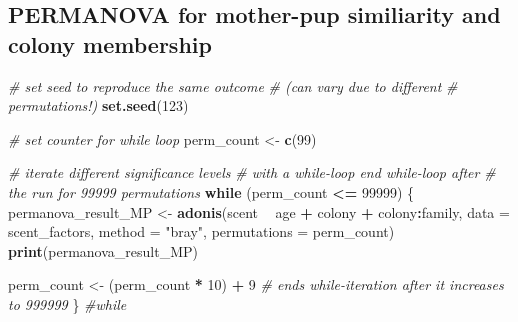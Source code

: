 \documentclass[]{article}
\newenvironment{Shaded}{\begin{snugshade}}{\end{snugshade}}
\newcommand{\KeywordTok}[1]{\textcolor[rgb]{0.13,0.29,0.53}{\textbf{#1}}}
\newcommand{\DataTypeTok}[1]{\textcolor[rgb]{0.13,0.29,0.53}{#1}}
\newcommand{\DecValTok}[1]{\textcolor[rgb]{0.00,0.00,0.81}{#1}}
\newcommand{\StringTok}[1]{\textcolor[rgb]{0.31,0.60,0.02}{#1}}
\newcommand{\CommentTok}[1]{\textcolor[rgb]{0.56,0.35,0.01}{\textit{#1}}}
\newcommand{\ControlFlowTok}[1]{\textcolor[rgb]{0.13,0.29,0.53}{\textbf{#1}}}
\newcommand{\OperatorTok}[1]{\textcolor[rgb]{0.81,0.36,0.00}{\textbf{#1}}}
\newcommand{\NormalTok}[1]{#1}
\begin{document}
\subsection{PERMANOVA for mother-pup similiarity and colony
membership}\label{permanova-for-mother-pup-similiarity-and-colony-membership}

\begin{Shaded}
\begin{Highlighting}[]
\CommentTok{# set seed to reproduce the same outcome}
\CommentTok{# (can vary due to different}
\CommentTok{# permutations!)}
\KeywordTok{set.seed}\NormalTok{(}\DecValTok{123}\NormalTok{)}

\CommentTok{# set counter for while loop}
\NormalTok{perm_count <-}\StringTok{ }\KeywordTok{c}\NormalTok{(}\DecValTok{99}\NormalTok{)}

\CommentTok{# iterate different significance levels}
\CommentTok{# with a while-loop end while-loop after}
\CommentTok{# the run for 99999 permutations}
\ControlFlowTok{while}\NormalTok{ (perm_count }\OperatorTok{<=}\StringTok{ }\DecValTok{99999}\NormalTok{) \{}
\NormalTok{    permanova_result_MP <-}\StringTok{ }\KeywordTok{adonis}\NormalTok{(scent }\OperatorTok{~}\StringTok{ }
\StringTok{        }\NormalTok{age }\OperatorTok{+}\StringTok{ }\NormalTok{colony }\OperatorTok{+}\StringTok{ }\NormalTok{colony}\OperatorTok{:}\NormalTok{family, }\DataTypeTok{data =}\NormalTok{ scent_factors, }
        \DataTypeTok{method =} \StringTok{"bray"}\NormalTok{, }\DataTypeTok{permutations =}\NormalTok{ perm_count)}
    \KeywordTok{print}\NormalTok{(permanova_result_MP)}
    
\NormalTok{    perm_count <-}\StringTok{ }\NormalTok{(perm_count }\OperatorTok{*}\StringTok{ }\DecValTok{10}\NormalTok{) }\OperatorTok{+}\StringTok{ }\DecValTok{9}  \CommentTok{# ends while-iteration after it increases to 999999}
\NormalTok{\}  }\CommentTok{#while}
\end{Highlighting}
\end{Shaded}
\end{document}

